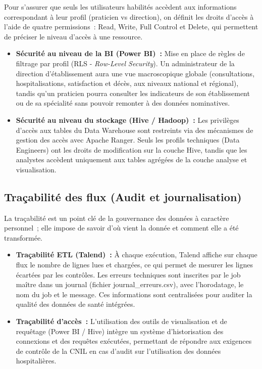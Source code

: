 \noindent Pour s’assurer que seuls les utilisateurs habilités accèdent aux informations correspondant à leur profil (praticien vs direction), on définit les droits d’accès à l’aide de quatre permissions~: Read, Write, Full Control et Delete, qui permettent de préciser le niveau d’accès à une ressource.
\begin{itemize}
	\item \textbf{Sécurité au niveau de la BI (Power BI)~:} Mise en place de règles de filtrage par profil (RLS - \textit{Row-Level Security}). Un administrateur de la direction d'établissement aura une vue macroscopique globale (consultations, hospitalisations, satisfaction et décès, aux niveaux national et régional), tandis qu'un praticien pourra consulter les indicateurs de son établissement ou de sa spécialité sans pouvoir remonter à des données nominatives.
	\item \textbf{Sécurité au niveau du stockage (Hive / Hadoop)~:} Les privilèges d'accès aux tables du Data Warehouse sont restreints via des mécanismes de gestion des accès avec Apache Ranger. Seuls les profils techniques (Data Engineers) ont les droits de modification sur la couche Hive, tandis que les analystes accèdent uniquement aux tables agrégées de la couche analyse et visualisation.
\end{itemize}

\subsection{Traçabilité des flux (Audit et journalisation)}

\noindent La traçabilité est un point clé de la gouvernance des données à caractère personnel~; elle impose de savoir d'où vient la donnée et comment elle a été transformée.
\begin{itemize}
	\item \textbf{Traçabilité ETL (Talend)~:} À chaque exécution, Talend affiche sur chaque flux le nombre de lignes lues et chargées, ce qui permet de mesurer les lignes écartées par les contrôles. Les erreurs techniques sont inscrites par le job maître dans un journal (fichier journal\_erreurs.csv), avec l'horodatage, le nom du job et le message. Ces informations sont centralisées pour auditer la qualité des données de santé intégrées.
	\item \textbf{Traçabilité d'accès~:} L'utilisation des outils de visualisation et de requêtage (Power BI / Hive) intègre un système d'historisation des connexions et des requêtes exécutées, permettant de répondre aux exigences de contrôle de la CNIL en cas d'audit sur l'utilisation des données hospitalières.
\end{itemize}


